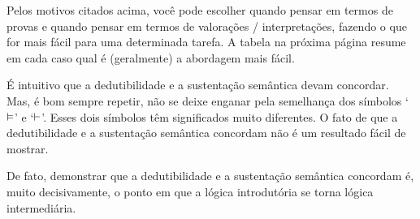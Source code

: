 Pelos  motivos citados acima, você pode escolher quando pensar em termos de provas e quando pensar em termos de valorações / interpretações, fazendo o que for mais fácil para uma determinada tarefa. A tabela na próxima página resume em cada caso qual é (geralmente) a abordagem mais fácil.

É intuitivo que a dedutibilidade e a sustentação semântica devam concordar. Mas, é bom sempre repetir, não se deixe enganar pela semelhança dos símbolos `$\vDash$' e `$\vdash$'. Esses dois símbolos têm significados muito diferentes. O fato de que a dedutibilidade  e a sustentação semântica concordam não é um resultado fácil de mostrar. 

De fato, demonstrar que a dedutibilidade e a sustentação semântica concordam é, muito decisivamente, o ponto em que a lógica introdutória se torna lógica intermediária.


